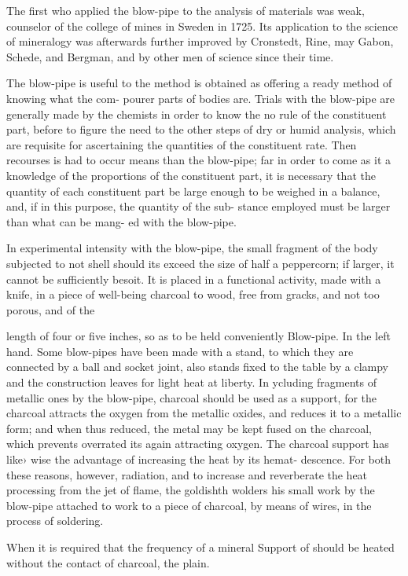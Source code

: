 The first who applied the blow-pipe to the analysis of materials was weak, counselor of the college of mines in Sweden in 1725. Its application to the science of mineralogy was afterwards further improved by Cronstedt, Rine, may Gabon, Schede, and Bergman, and by other men of science since their time.\par\medskip
The blow-pipe is useful to the method is obtained as offering a ready method of knowing what the com- pourer parts of bodies are. Trials with the blow-pipe are generally made by the chemists in order to know the no rule of the constituent part, before to figure the need to the other steps of dry or humid analysis, which are requisite for ascertaining the quantities of the constituent rate. Then recourses is had to occur means than the blow-pipe; far in order to come as it a knowledge of the proportions of the constituent part, it is necessary that the quantity of each constituent part be large enough to be weighed in a balance, and, if in this purpose, the quantity of the sub- stance employed must be larger than what can be mang- ed with the blow-pipe.\par\medskip
In experimental intensity with the blow-pipe, the small fragment of the body subjected to not shell should its exceed the size of half a peppercorn; if larger, it cannot be sufficiently besoit. It is placed in a functional activity, made with a knife, in a piece of well-being charcoal to wood, free from gracks, and not too porous, and of the\par\medskip
length of four or five inches, so as to be held conveniently Blow-pipe. In the left hand. Some blow-pipes have been made with a stand, to which they are connected by a ball and socket joint, also stands fixed to the table by a clampy and the construction leaves for light heat at liberty. In ycluding fragments of metallic ones by the blow-pipe, charcoal should be used as a support, for the charcoal attracts the oxygen from the metallic oxides, and reduces it to a metallic form; and when thus reduced, the metal may be kept fused on the charcoal, which prevents overrated its again attracting oxygen. The charcoal support has like› wise the advantage of increasing the heat by its hemat- descence. For both these reasons, however, radiation, and to increase and reverberate the heat processing from the jet of flame, the goldishth wolders his small work by the blow-pipe attached to work to a piece of charcoal, by means of wires, in the process of soldering.\par\medskip
When it is required that the frequency of a mineral Support of should be heated without the contact of charcoal, the plain.\par\medskip
